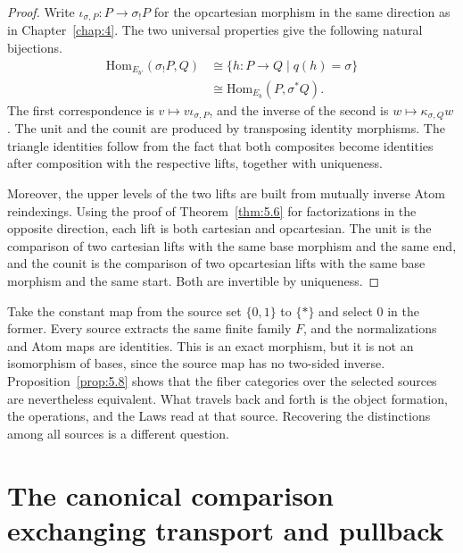 \begin{proof}

Write $\iota_{\sigma,P}:P\to\sigma_!P$ for the opcartesian morphism in the same direction as
in Chapter~\ref{chap:4}. The two universal properties give the following natural bijections.
\begin{equation*}
\begin{aligned}
\mathrm{Hom}_{E_{b'}}(\sigma_!P,Q)
&\cong\{h:P\to Q\mid q(h)=\sigma\}\\
&\cong\mathrm{Hom}_{E_b}(P,\sigma^*Q).
\end{aligned}
\tag{5.13}\label{eq:5.13}
\end{equation*}
The first correspondence is $v\mapsto v\iota_{\sigma,P}$, and the inverse of the second is
$w\mapsto\kappa_{\sigma,Q}w$. The unit and the counit are produced by transposing identity
morphisms. The triangle identities follow from the fact that both composites become identities
after composition with the respective lifts, together with uniqueness.

Moreover, the upper levels of the two lifts are built from mutually inverse Atom reindexings.
Using the proof of Theorem~\ref{thm:5.6} for factorizations in the opposite direction, each
lift is both cartesian and opcartesian. The unit is the comparison of two cartesian lifts
with the same base morphism and the same end, and the counit is the comparison of two
opcartesian lifts with the same base morphism and the same start. Both are invertible by
uniqueness.

\end{proof}

\begin{example}\label{ex:5.9}

Take the constant map from the source set $\{0,1\}$ to $\{*\}$ and select $0$ in the former.
Every source extracts the same finite family $F$, and the normalizations and Atom maps are
identities. This is an exact morphism, but it is not an isomorphism of bases, since the
source map has no two-sided inverse. Proposition~\ref{prop:5.8} shows that the fiber
categories over the selected sources are nevertheless equivalent. What travels back and
forth is the object formation, the operations, and the Laws read at that source. Recovering
the distinctions among all sources is a different question.

\end{example}

\section{The canonical comparison exchanging transport and pullback}\label{sec:5.3}

